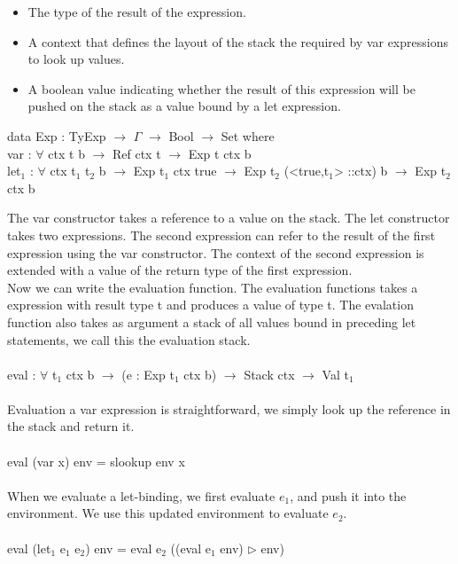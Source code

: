 \documentclass[paper=a4, fontsize=11pt]{scrartcl} %
\numberwithin{equation}{section} %
\numberwithin{figure}{section} %
\numberwithin{table}{section} %
\begin{document}
\begin{itemize}
  \item The type of the result of the expression.
  \item A context that defines the layout of the stack the required by \ttfamily var \normalfont expressions to look up values.
  \item A boolean value indicating whether the result of this expression will be pushed on the stack as a value bound by a let expression.
\end{itemize}

\ttfamily

data Exp : TyExp $\rightarrow$ $\Gamma$ $\rightarrow$ Bool $\rightarrow$ Set where\\
\hspace*{5mm}var  : $\forall$ {ctx t b} $\rightarrow$ Ref ctx t $\rightarrow$ Exp t ctx b\\
\hspace*{5mm}let$_1$ : $\forall$ {ctx t$_1$ t$_2$ b} $\rightarrow$ Exp t$_1$ ctx true $\rightarrow$ Exp t$_2$ (<true,t$_1$>  ::ctx) b $\rightarrow$ Exp t$_2$ ctx b\\

\normalfont

The \ttfamily var \normalfont constructor takes a reference to a value on the stack. The \ttfamily let \normalfont constructor takes two expressions. The second expression can refer to the result of the first expression using the \ttfamily var \normalfont constructor. The context of the second expression is extended with a value of the return type of the first expression.\\

Now we can write the evaluation function. The evaluation functions takes a expression with result type t and produces a value of type t. The evalation function also takes as argument a stack of all values bound in preceding \ttfamily let \normalfont statements, we call this the evaluation stack. \\
\ttfamily
\\eval : $\forall$ {t$_1$ ctx b} $\rightarrow$ (e : Exp t$_1$ ctx b) $\rightarrow$ Stack ctx $\rightarrow$ Val t$_1$\\
\normalfont
\\Evaluation a \ttfamily var \normalfont expression is straightforward, we simply look up the reference in the stack and return it.\\
\ttfamily
\\eval (var x) env = slookup env x\\
\normalfont
\\When we evaluate a let-binding, we first evaluate \ttfamily $e_1$\normalfont, and push it into the environment. We use this updated environment to evaluate \ttfamily$e_2$\normalfont.\\
\normalfont
\ttfamily
\\eval (let$_1$ e$_1$ e$_2$) env = eval e$_2$ ((eval e$_1$ env) $\rhd$ env)\\
\normalfont
\end{document}
